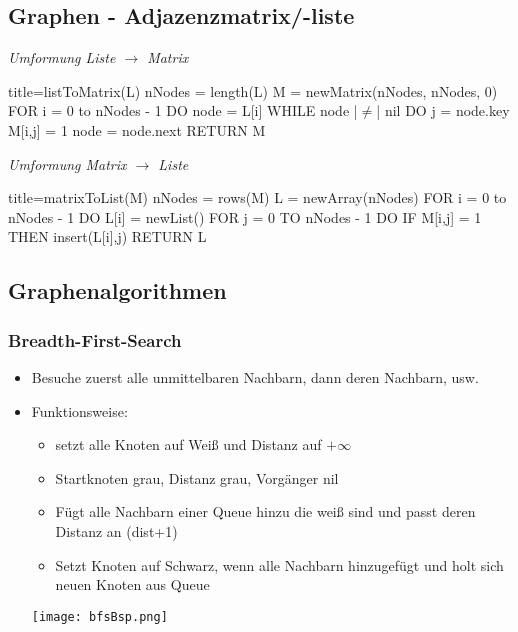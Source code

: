     \subsection{Graphen - Adjazenzmatrix/-liste}
        \begin{minipage}{0.45\textwidth}
            \textit{Umformung Liste $\rightarrow$ Matrix}
            \begin{ccode}[autogobble, escapeinside = ||]{title={listToMatrix(L)}}
                nNodes = length(L)
                M = newMatrix(nNodes, nNodes, 0)
                FOR i = 0 to nNodes - 1 DO
                    node = L[i]
                    WHILE node |$\neq$| nil DO
                        j = node.key
                        M[i,j] = 1
                        node = node.next
                RETURN M
            \end{ccode}
        \end{minipage}
        \begin{minipage}{0.45\textwidth}
            \textit{Umformung Matrix $\rightarrow$ Liste}
            \begin{ccode}[autogobble, escapeinside = ||]{title={matrixToList(M)}}
                nNodes = rows(M)
                L = newArray(nNodes)
                FOR i = 0 to nNodes - 1 DO
                    L[i] = newList()
                    FOR j = 0 TO nNodes - 1 DO
                        IF M[i,j] = 1 THEN
                            insert(L[i],j)
                RETURN L
            \end{ccode}
        \end{minipage}

    

    \subsection{Graphenalgorithmen}
        \subsubsection{Breadth-First-Search}
            \begin{itemize}
                \item Besuche zuerst alle unmittelbaren Nachbarn, dann deren Nachbarn, usw.
                \item Funktionsweise:
                    \begin{itemize}
                        \item setzt alle Knoten auf Weiß und Distanz auf $+\infty$
                        \item Startknoten grau, Distanz grau, Vorgänger nil
                        \item Fügt alle Nachbarn einer Queue hinzu die weiß sind und passt deren Distanz an (dist+1)
                        \item Setzt Knoten auf Schwarz, wenn alle Nachbarn hinzugefügt und holt sich neuen Knoten aus Queue
                    \end{itemize}
            \centerline{\texttt{[image: bfsBsp.png]}}
            \end{itemize}
\pagebreak

